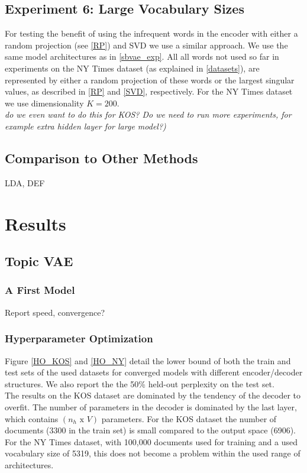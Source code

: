 \documentclass{report}
\begin{document}
	\subsection{Experiment 6: Large Vocabulary Sizes}\label{large_voc_size}
	For testing the benefit of using the infrequent words in the encoder with either a random projection (see \ref{RP}) and SVD  we use a similar approach. We use the same model architectures as in \ref{sbvae_exp}. All all words not used so far in experiments on the NY Times dataset (as explained in \ref{datasets}), are represented by either a random projection of these words or the largest singular values, as described in \ref{RP} and \ref{SVD}, respectively. For the NY Times dataset we use dimensionality $K = 200$. \\
	\textit{do we even want to do this for KOS? Do we need to run more experiments, for example extra hidden layer for large model?)}
		
	\subsection{Comparison to Other Methods}
	LDA, DEF
	
	
	
	\section{Results}
	
	\subsection{Topic VAE}
	
	\subsubsection{A First Model}
	Report speed, convergence?
	\subsubsection{Hyperparameter Optimization}\label{ho}
	
	Figure \ref{HO_KOS} and \ref{HO_NY} detail the lower bound of both the train and test sets of the used datasets for converged models with different encoder/decoder structures. We also report the the 50\% held-out perplexity on the test set.\\
	The results on the KOS dataset are dominated by the tendency of the decoder to overfit. The number of parameters in the decoder is dominated by the last layer, which contains $(n_h \text{ x } V)$ parameters. For the KOS dataset the number of documents (3300 in the train set) is small compared to the output space (6906). For the NY Times dataset, with 100,000 documents used for training and a used vocabulary size of 5319, this does not become a problem within the used range of architectures.  
	
\end{document}
